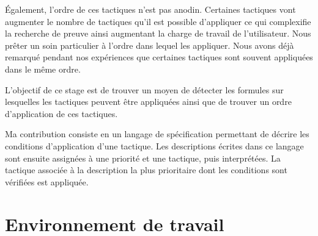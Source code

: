 \documentclass[titlepage,draft]{article}
\begin{document}
Également, l'ordre de ces tactiques n'est pas anodin. Certaines tactiques vont augmenter le nombre de tactiques qu'il est possible d'appliquer ce qui complexifie la recherche de preuve ainsi augmentant la charge de travail de l'utilisateur. Nous prêter un soin particulier à l'ordre dans lequel les appliquer. Nous avons déjà remarqué pendant nos expériences que certaines tactiques sont souvent appliquées dans le même ordre.

L'objectif de ce stage est de trouver un moyen de détecter les formules sur lesquelles les tactiques peuvent être appliquées ainsi que de trouver un ordre d'application de ces tactiques.

Ma contribution consiste en un langage de spécification permettant de décrire les conditions d'application d'une tactique. Les descriptions écrites dans ce langage sont ensuite assignées à une priorité et une tactique, puis interprétées. La tactique associée à la description la plus prioritaire dont les conditions sont vérifiées est appliquée.


\begin{comment}
\section*{Prototypage (ancienne rédaction)} \label{Prototypage}
Pour des raisons de complexité, nous avons commencé par réaliser un prototype avant de démarrer l'implémentation dans Coq. Ce prototype nous a permis de tester nos différentes idées, de nous rendre compte des difficultés qui peuvent être rencontrées, valider certains choix techniques et d'implémentation, ainsi que de nous familiariser avec les outils de développement. Pour cela nous avons utilisé un mini assistant de preuve, réalisé par Louise, implémentant la déduction naturelle intuitionniste propositionnelle. Ce projet est programmé en OCaml ce qui est un atout pour nous, car c'est le langage qui est utilisé pour implémenter Coq.
\end{comment}

\section{Environnement de travail}
\end{document}
